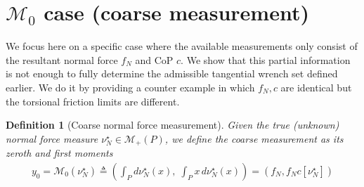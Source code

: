 \documentclass[11pt,a4paper]{article}
\theoremstyle{proposition}
\newtheorem{definition}[theorem]{Definition}
\begin{document}
\begin{table}[t]
    \centering
    \small
    \caption{Measurement operators and corresponding compatible CoP sets.}
    \label{tab:measurement_cases}
\end{table}

\section{$\mathcal{M}_0$ case (coarse measurement)}
\label{sec:M0}

We focus here on a specific case where the available measurements only consist of the resultant normal force $f_N$ and CoP $c$. We show that this partial information is not enough to fully determine the admissible tangential wrench set defined earlier. We do it by providing a counter example in which $f_N,c$ are identical but the torsional friction limits are different.

\begin{definition}[Coarse normal force measurement]\label{def:coarse_measurement}
    Given the true (unknown) normal force measure $\nu_N^\star\in\mathcal M_+(P)$,
    we define the coarse measurement as its zeroth and first moments 
    \begin{align}
    y_0 = \mathcal M_0(\nu_N^\star) \triangleq \left(\int_P d\nu_N^\star(x),\;\int_P x\,d\nu_N^\star(x)\right) = (f_N,f_Nc[\nu_N^\star])
    \end{align}
\end{definition}
\end{document}
